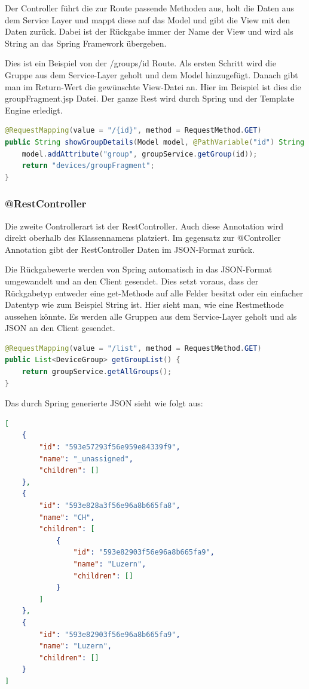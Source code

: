 Der Controller führt die zur Route passende Methoden aus, holt die Daten aus dem Service Layer und mappt diese auf das Model und gibt die View mit den Daten zurück. Dabei ist der Rückgabe immer der Name der View und wird als String an das Spring Framework übergeben.

Dies ist ein Beispiel von der /groups/id Route. Als ersten Schritt wird die Gruppe aus dem Service-Layer geholt und dem Model hinzugefügt. Danach gibt man im Return-Wert die gewünschte View-Datei an. Hier im Beispiel ist dies die groupFragment.jsp Datei. Der ganze Rest wird durch Spring und der Template Engine erledigt.
\begin{lstlisting}[language=java]
@RequestMapping(value = "/{id}", method = RequestMethod.GET)
public String showGroupDetails(Model model, @PathVariable("id") String id) {
	model.addAttribute("group", groupService.getGroup(id));
	return "devices/groupFragment";
}
\end{lstlisting}
\subsubsection{@RestController}
Die zweite Controllerart ist der RestController. Auch diese Annotation wird direkt oberhalb des Klassennamens platziert. Im gegensatz zur @Controller Annotation gibt der RestController Daten im JSON-Format zurück. 

Die Rückgabewerte werden von Spring automatisch in das JSON-Format umgewandelt und an den Client gesendet. Dies setzt voraus, dass der Rückgabetyp entweder eine get-Methode auf alle Felder besitzt oder ein einfacher Datentyp wie zum Beispiel String ist.
Hier sieht man, wie eine Restmethode aussehen könnte. Es werden alle Gruppen aus dem Service-Layer geholt und als JSON an den Client gesendet.
\begin{lstlisting}[language=java]
@RequestMapping(value = "/list", method = RequestMethod.GET)
public List<DeviceGroup> getGroupList() {
	return groupService.getAllGroups();
}
\end{lstlisting}

Das durch Spring generierte JSON sieht wie folgt aus:
\begin{lstlisting}[language=json]
[
    {
        "id": "593e57293f56e959e84339f9",
        "name": "_unassigned",
        "children": []
    },
    {
        "id": "593e828a3f56e96a8b665fa8",
        "name": "CH",
        "children": [
            {
                "id": "593e82903f56e96a8b665fa9",
                "name": "Luzern",
                "children": []
            }
        ]
    },
    {
        "id": "593e82903f56e96a8b665fa9",
        "name": "Luzern",
        "children": []
    }
]
\end{lstlisting}

